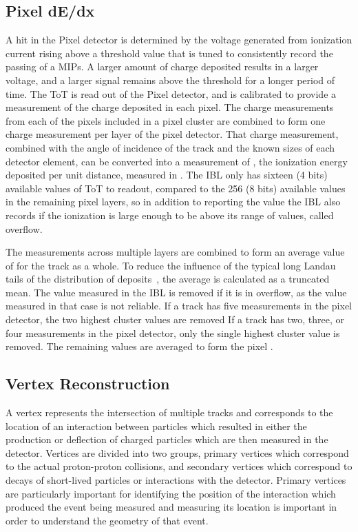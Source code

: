 \subsection{Pixel dE/dx}
\label{sec:pixel_dedx}

A hit in the Pixel detector is determined by the voltage generated from ionization current rising above a threshold value that is tuned to consistently record the passing of a \acp{MIP}. 
A larger amount of charge deposited results in a larger voltage, and a larger signal remains above the threshold for a longer period of time.
The \ac{ToT} is read out of the Pixel detector, and is calibrated to provide a measurement of the charge deposited in each pixel.
The charge measurements from each of the pixels included in a pixel cluster are combined to form one charge measurement per layer of the pixel detector.
That charge measurement, combined with the angle of incidence of the track and the known sizes of each detector element, can be converted into a measurement of \dedx, the ionization energy deposited per unit distance, measured in \MeVgcm. 
The \ac{IBL} only has sixteen (4 bits) available values of \ac{ToT} to readout, compared to the 256 (8 bits) available values in the remaining pixel layers, so in addition to reporting the value the \ac{IBL} also records if the ionization is large enough to be above its range of values, called overflow.

The measurements across multiple layers are combined to form an average value of \dedx for the track as a whole.
To reduce the influence of the typical long Landau tails of the distribution of \dedx deposits~\cite{pdg}, the average is calculated as a truncated mean.
The value measured in the \ac{IBL} is removed if it is in overflow, as the value measured in that case is not reliable.
If a track has five measurements in the pixel detector, the two highest cluster values are removed
If a track has two, three, or four measurements in the pixel detector, only the single highest cluster value is removed.
The remaining values are averaged to form the pixel \dedx.

\subsection{Vertex Reconstruction}

A vertex represents the intersection of multiple tracks and corresponds to the location of an interaction between particles which resulted in either the production or deflection of charged particles which are then measured in the detector. 
Vertices are divided into two groups, primary vertices which correspond to the actual proton-proton collisions, and secondary vertices which correspond to decays of short-lived particles or interactions with the detector. 
Primary vertices are particularly important for identifying the position of the interaction which produced the event being measured and measuring its location is important in order to understand the geometry of that event.

